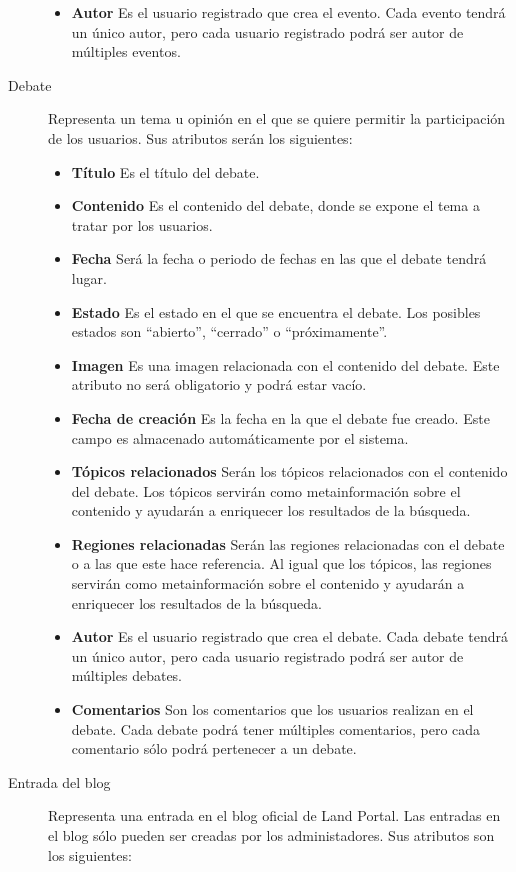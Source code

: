 \begin{description}
\begin{itemize}
							\item \textbf{Autor}  Es el usuario registrado que crea el evento.  Cada evento tendrá un único autor, pero cada usuario registrado podrá ser autor de múltiples eventos.
							\end{itemize}
\item[Debate]  Representa un tema u opinión en el que se quiere permitir la participación de los usuarios.  Sus atributos serán los siguientes:
							\begin{itemize}
							\item \textbf{Título}  Es el título del debate.
							\item \textbf{Contenido}  Es el contenido del debate, donde se expone el tema a tratar por los usuarios.
							\item \textbf{Fecha}  Será la fecha o periodo de fechas en las que el debate tendrá lugar.
							\item \textbf{Estado}  Es el estado en el que se encuentra el debate.  Los posibles estados son ``abierto'', ``cerrado'' o ``próximamente''.
							\item \textbf{Imagen}  Es una imagen relacionada con el contenido del debate.  Este atributo no será obligatorio y podrá estar vacío.
							\item \textbf{Fecha de creación}  Es la fecha en la que el debate fue creado.  Este campo es almacenado automáticamente por el sistema.
							\item \textbf{Tópicos relacionados}  Serán los tópicos relacionados con el contenido del debate.  Los tópicos servirán como metainformación sobre el contenido y ayudarán a enriquecer los resultados de la búsqueda.
							\item \textbf{Regiones relacionadas}  Serán las regiones relacionadas con el debate o a las que este hace referencia.  Al igual que los tópicos, las regiones servirán como metainformación sobre el contenido y ayudarán a enriquecer los resultados de la búsqueda.
							\item \textbf{Autor}  Es el usuario registrado que crea el debate.  Cada debate tendrá un único autor, pero cada usuario registrado podrá ser autor de múltiples debates.
							\item \textbf{Comentarios}  Son los comentarios que los usuarios realizan en el debate.  Cada debate podrá tener múltiples comentarios, pero cada comentario sólo podrá pertenecer a un debate.
							\end{itemize}
\item[Entrada del blog]  Representa una entrada en el blog oficial de Land Portal.  Las entradas en el blog sólo pueden ser creadas por los administadores.  Sus atributos son los siguientes:

\end{description}
